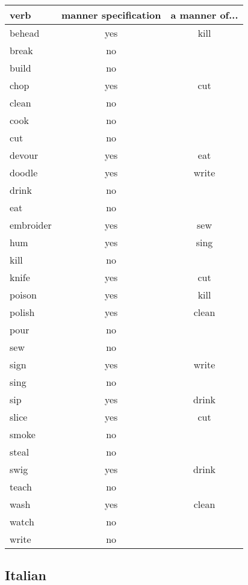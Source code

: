 \begin{longtable}{l|cc}
\textbf{verb}     & \textbf{manner specification} & \textbf{a manner of...}   \\
\hline
\endhead
behead    & yes    & kill     \\
break     & no    &       \\
build     & no    &       \\
chop      & yes    &  cut    \\
clean     & no    &       \\
cook      & no    &       \\
cut       & no    &       \\
devour    & yes    &  eat    \\
doodle    & yes    &  write    \\
drink     & no    &       \\
eat       & no    &       \\
embroider & yes    & sew     \\
hum       & yes    &  sing    \\
kill      & no    &       \\
knife     & yes    &  cut    \\
poison    & yes    & kill     \\
polish    & yes    & clean     \\
pour      & no    &       \\
sew       & no    &       \\
sign      & yes    &  write    \\
sing      & no    &       \\
sip       & yes    & drink     \\
slice     & yes    &  cut    \\
smoke     & no    &       \\
steal     & no    &       \\
swig      & yes    &  drink    \\
teach     & no    &       \\
wash      & yes    & clean     \\
watch     & no    &       \\
write     & no    &      
\end{longtable}


\subsection{Italian}

